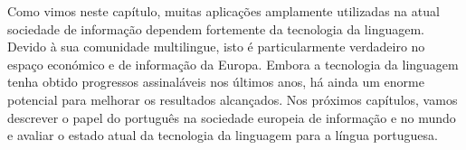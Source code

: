 \begin{multicols}{2}

Como vimos neste capítulo, muitas aplicações amplamente utilizadas na atual sociedade de informação dependem fortemente da tecnologia da linguagem. Devido à sua comunidade multilingue, isto é particularmente verdadeiro no espaço económico e de informação da Europa. Embora a tecnologia da linguagem tenha obtido progressos assinaláveis nos últimos anos, há ainda um enorme potencial para melhorar os resultados alcançados. Nos próximos capítulos, vamos descrever o papel do português na sociedade europeia de informação e no mundo e avaliar o estado atual da tecnologia da linguagem para a língua portuguesa.

\end{multicols}

\clearpage



